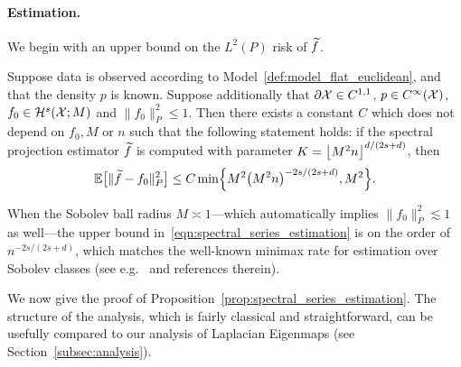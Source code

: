 \paragraph{Estimation.}
We begin with an upper bound on the $L^2(P)$ risk of $\widetilde{f}$.
\begin{proposition}
	\label{prop:spectral_series_estimation}
	Suppose data is observed according to Model~\ref{def:model_flat_euclidean}, and that the density $p$ is known.  Suppose additionally that $\partial \mathcal{X} \in C^{1,1}$, $p \in C^{\infty}(\mathcal{X})$, $f_0 \in \mathcal{H}^{s}(\mathcal{X};M)$ and $\|f_0\|_P^2 \leq 1$. Then there exists a constant $C$ which does not depend on $f_0,M$ or $n$ such that the following statement holds: if the spectral projection estimator $\widetilde{f}$ is computed with parameter $K = \left\lfloor M^2n \right\rfloor^{d/(2s + d)}$, then
	\begin{equation}
	\label{eqn:spectral_series_estimation}
	\mathbb{E}\bigl[\|\widetilde{f} - f_0\|_P^2\bigr] \leq C \min\Bigl\{M^2\bigl(M^2n\bigr)^{-2s/(2s + d)}, M^2\Bigr\}.
	\end{equation}
\end{proposition}
When the Sobolev ball radius $M \asymp 1$---which automatically implies $\|f_0\|_{P}^2 \lesssim 1$ as well---the upper bound in~\eqref{eqn:spectral_series_estimation} is on the order of $n^{-2s/(2s + d)}$, which matches the well-known minimax rate for estimation over Sobolev classes (see e.g.~\cite{wasserman2006,tsybakov08} and references therein). 


We now give the proof of Proposition~\ref{prop:spectral_series_estimation}. The structure of the analysis, which is fairly classical and straightforward, can be usefully compared to our analysis of Laplacian Eigenmaps (see Section~\ref{subsec:analysis}).

